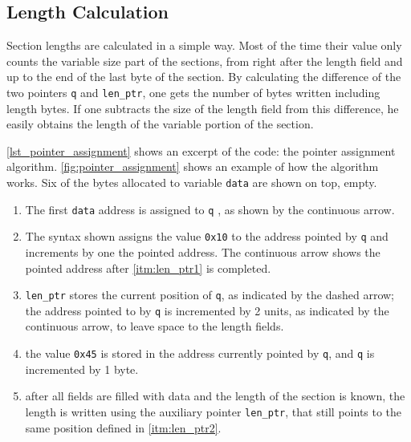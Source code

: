 \documentclass[
	12pt,				%
	openright,			%
	twoside,			%
	a4paper,			%
	brazil,
	french,				%
	english
	]{abntex2}
\begin{document}
\subsection{Length Calculation}

Section lengths are calculated in a simple way. Most of the time their value only counts the variable size part of the sections, from right after the length field and up to the end of the last byte of the section. By calculating the difference of the two pointers \texttt{q} and \texttt{len\_ptr}, one gets the number of bytes written including length bytes. If one subtracts the size of the length field from this difference, he easily obtains the length of the variable portion of the section.

\autoref{lst_pointer_assignment} shows an excerpt of the code: the pointer assignment algorithm. \autoref{fig:pointer_assignment} shows an example of how the  algorithm works. Six of the bytes allocated to variable \texttt{data} are shown on top, empty.
\begin{enumerate}
\item The first \texttt{data} address is assigned to \texttt{q} , as shown by the continuous arrow.
\item \label{itm:len_ptr1} The syntax shown assigns the value \texttt{0x10} to the address pointed by \texttt{q} and increments by one the pointed address. The continuous arrow shows the pointed address after \autoref{itm:len_ptr1} is completed.
\item \label{itm:len_ptr2} \texttt{len\_ptr} stores the current position of \texttt{q}, as indicated by the dashed arrow; the address pointed to by \texttt{q} is incremented by 2 units, as indicated by the continuous arrow, to leave space to the length fields.
\item the value \texttt{0x45} is stored in the address currently pointed by \texttt{q}, and \texttt{q} is incremented by 1 byte.
\item after all fields are filled with data and the length of the section is known, the length is written using the auxiliary pointer \texttt{len\_ptr}, that still points to the same position defined in \autoref{itm:len_ptr2}.
\end{enumerate}
\end{document}
